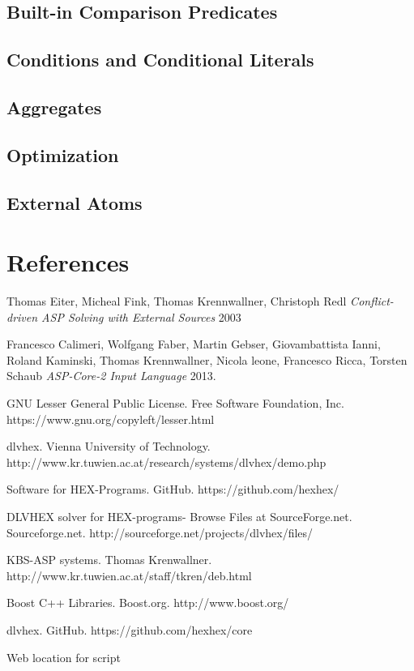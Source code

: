 \documentclass[14pt,a4paper, titlepage]{article}
\begin{document}
\subsection{Built-in Comparison Predicates}
\subsection{Conditions and Conditional Literals}
\subsection{Aggregates}
\subsection{Optimization}
\subsection{External Atoms}

\section{References}
\begin{thebibliography}{1}
 Thomas Eiter, Micheal Fink, Thomas Krennwallner, Christoph Redl {\em Conflict-driven ASP Solving with External Sources} 2003   
  
 Francesco Calimeri, Wolfgang Faber, Martin Gebser, Giovambattista Ianni, Roland Kaminski, Thomas Krennwallner, Nicola leone, Francesco Ricca, Torsten Schaub {\em ASP-Core-2 Input Language} 2013.

 GNU Lesser General Public License. Free Software Foundation, Inc. https://www.gnu.org/copyleft/lesser.html 

dlvhex. Vienna University of Technology. http://www.kr.tuwien.ac.at/research/systems/dlvhex/demo.php 

Software for HEX-Programs. GitHub. https://github.com/hexhex/ 

DLVHEX solver for HEX-programs-  Browse Files at SourceForge.net. Sourceforge.net. http://sourceforge.net/projects/dlvhex/files/

KBS-ASP systems. Thomas Krenwallner. http://www.kr.tuwien.ac.at/staff/tkren/deb.html

Boost C++ Libraries. Boost.org. http://www.boost.org/

dlvhex. GitHub. https://github.com/hexhex/core

Web location for script
      
 
 \end{thebibliography} 
\end{document}
